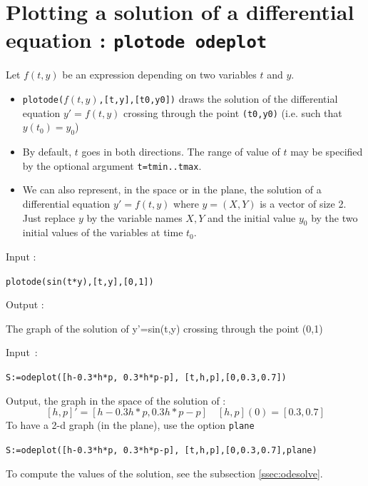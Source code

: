 \documentclass[a4paper,11pt]{book}
\begin{document}
\section{Plotting a solution of a differential equation : {\tt plotode odeplot}}
\noindent Let $f(t,y)$ be an expression depending on two variables 
$t$ and $y$.
\begin{itemize}
\item {\tt plotode($f(t,y)$,[t,y],[t0,y0])} draws the solution of 
the differential equation $y'=f(t,y)$ crossing through 
the point {\tt (t0,y0)} (i.e. such that $y(t_0)=y_0$)
\item
By default, $t$ goes in both directions. The range of value of $t$
may be specified by the optional argument
{\tt t=tmin..tmax}.
\item
We can also represent, in the space or in the plane,
the solution of a differential equation 
$y'=f(t,y)$ where $y=(X,Y)$ is a vector of size 2.
Just replace  $y$ by the variable names $X,Y$
and the initial value $y_0$ by the two initial values of the
variables at time $t_0$.
\end{itemize}
Input :
\begin{center}{\tt plotode(sin(t*y),[t,y],[0,1]) }\end{center}
Output :
\begin{center}{The graph of the solution of y'=sin(t,y) crossing through the point (0,1)}\end{center}
Input~:
\begin{center}
{\tt S:=odeplot([h-0.3*h*p, 0.3*h*p-p], [t,h,p],[0,0.3,0.7])}
\end{center}
Output, the graph in the space of the solution of :
\[ [h,p]'=[h-0.3 h*p, 0.3 h*p-p] \quad [h,p](0)=[0.3,0.7] \]
To have a 2-d graph (in the plane), use the option 
{\tt plane}
\begin{center}
{\tt S:=odeplot([h-0.3*h*p, 0.3*h*p-p], [t,h,p],[0,0.3,0.7],plane)}
\end{center}
To compute the values of the solution, see
the subsection \ref{ssec:odesolve}.
\end{document}
